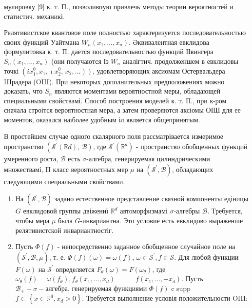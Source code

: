 \documentclass[10pt]{article}
\begin{document}
мулировку [9] к. т. П., позволивпую привлечь методы теории вероятностей и статистич. механикі.



Релятивистское квантовое поле полностью характеризуется последовательностью своих функций Уайтмана $W_{n}\left(x_{1}, \ldots, x_{n}\right)$. Әквивалентная евклидова формулитовка к. т. П. дается последовательностью функций ІІвингера $S_{n}\left(x_{1}, \ldots, x_{n}\right)$ (они получаются Із $W_{n}$ аналігтич. продолженшем в евклидовы точкі $\left(i x_{1}^{0}, x_{1}, \imath x_{2}^{0}\right.$, $\left.\left.x_{2}, \ldots\right)\right)$, удовлетворяющих аксиомам Остервальдера IIIрадера (OIII). При некоторых дополнительных предположениях можно доказать, что $S_{n}$ являются моментами вероятностной меры, обладающей специальными свойствамі. Способ построения моделей к. т. П., при к-ром сначала строітся вероятностная мера, а затем проверяются аксіомы ОІШ для ее моментов, оказался наıболее удобным іл является общепринятым.



В простейшем случае одного скалярного поля рассматрівается измеримое пространство $\left(\mathscr{S}^{\prime}(\mathbb{R} d)\right.$, $\left.\mathscr{B}\right)$, где $\mathscr{S}^{\prime}\left(\mathbb{R}^{d}\right)$ - пространство обобщенных функциӥ умеренного роста, $\mathscr{B}$ есть $\sigma$-алгебра, генерируемая цилиндрическими множествамі, II класс вероятностных мер $\mu$ на $\left(\mathscr{S}^{\prime}, \mathscr{B}\right)$, обладающих следующими специальными свойствами.



\begin{enumerate}

  \item На $\left(\mathscr{S}^{\prime}, \mathscr{B}\right)$ задано естественное представление связной компоненты едіницы $G$ евклидовой группы двіжениї $\mathbb{R}^{d}$ автоморфизмамі $\sigma$-алгебры $\mathscr{B}$. Требуется, чтобы мера $\mu$ была $G$-инвариантна. Это условие есть евклидово выраженше релятивистской инвариантностіг.



  \item Пусть $\Phi(f)$ - непосредственно заданное обобщенное случайное поле на $\left(\mathscr{S}^{\prime}, \mathscr{B}, \mu\right)$, т. е. $\Phi(f)(\omega)=\omega(f)$, $\omega \in \mathscr{S}^{\prime}, f \in \mathscr{S}$. Для любой функции $F(\omega)$ на $\mathscr{S}^{\prime}$ определяется $F_{\theta}(\omega)=F\left(\omega_{\theta}\right)$, где $\omega_{\theta}(f)=\omega\left(f_{\theta}\right), f_{\theta}\left(x_{1}, \ldots, x_{d}\right)=$ $=f\left(x_{1}, \ldots,-x_{d}\right)$. Пусть $\mathscr{B}_{+}-\sigma-а л г е б р а$, генерируемая функциями $\Phi(f)$ c supp $f \subset\left\{x \in \mathbb{R}^{d}, x_{d}>0\right\}$. Требуется выполнение условія положительности OIII:



\end{enumerate}
\end{document}
